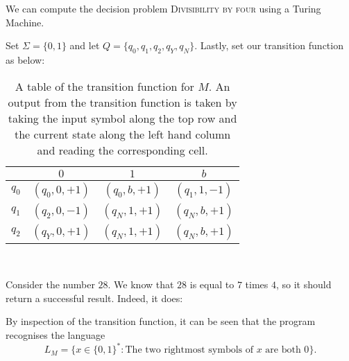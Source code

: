 \begin{example}
    We can compute the decision problem \textsc{Divisibility by four} using a Turing Machine.
    
    Set \(\Sigma = \{0,1\}\) and let \(Q = \{q_0,q_1,q_2,q_Y,q_N\}\). Lastly, set our transition function as below:

    \begin{table}[h]
    \centering
        \begin{tabular}{|c|c|c|c|}
            \hline
            & \(0\) & \(1\) & \(b\) \\
            \hline
            \(q_0\) & \((q_0,0,+1)\) & \((q_0,b,+1)\) & \((q_1,1,-1)\) \\
            \hline
            \(q_1\) & \((q_2,0,-1)\) & \((q_N, 1, +1)\) & \((q_N,b,+1)\) \\
            \hline
            \(q_2\) & \((q_Y,0,+1)\) & \((q_N,1,+1)\) & \((q_N,b,+1)\)\\
            \hline
        \end{tabular}\\
        \caption{A table of the transition function for $M$. An output from the transition function is taken by taking the input symbol along the top row and the current state along the left hand column and reading the corresponding cell.}
        \label{table:DivisibilityByFourTransitionTable}
    \end{table}
    Consider the number $28$. We know that $28$ is equal to $7$ times $4$, so it should return a successful result. Indeed, it does:

    

    By inspection of the transition function, it can be seen that the program recognises the language \[L_M = \{x \in \{0,1\}^*:\text{The two rightmost symbols of $x$ are both 0}\} \text{.}\]
\end{example}